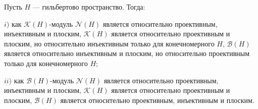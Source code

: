 \begin{proposition}\label{KHAndBHModsRelTh} Пусть $H$ --- гильбертово пространство. Тогда:

$i)$ как $\mathcal{K}(H)$-модуль $\mathcal{N}(H)$ является относительно проективным, инъективным и плоским, $\mathcal{K}(H)$ является относительно проективным и плоским, но относительно инъективным только для конечномерного $H$, $\mathcal{B}(H)$ является относительно инъективным и плоским, но относительно проективным только для конечномерного $H$;

$ii)$ как $\mathcal{B}(H)$-модуль $\mathcal{N}(H)$ является относительно проективным, инъективным и плоским, $\mathcal{K}(H)$ является относительно проективным и плоским, $\mathcal{B}(H)$ является относительно проективным, инъективным и плоским.
\end{proposition}
